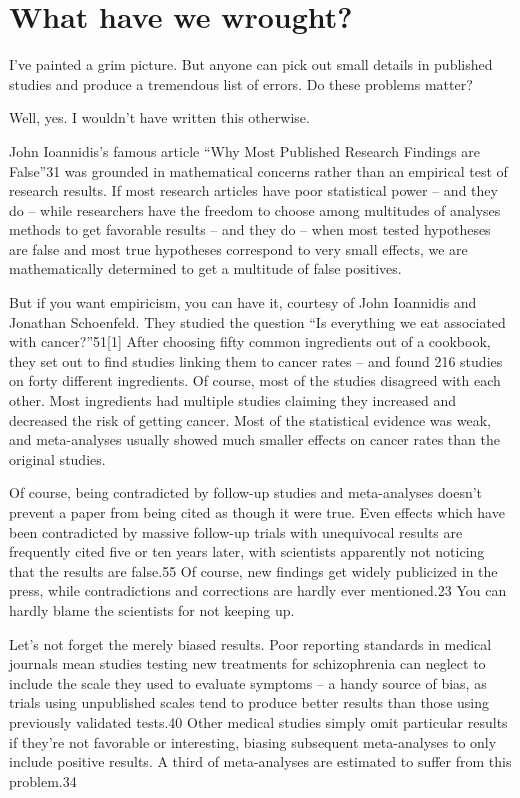 \chapter{What have we wrought?}
\label{chp11}


I’ve painted a grim picture. But anyone can pick out small details in published studies and produce a tremendous list of errors. Do these problems matter?

Well, yes. I wouldn’t have written this otherwise.

John Ioannidis’s famous article “Why Most Published Research Findings are False”31 was grounded in mathematical concerns rather than an empirical test of research results. If most research articles have poor statistical power – and they do – while researchers have the freedom to choose among multitudes of analyses methods to get favorable results – and they do – when most tested hypotheses are false and most true hypotheses correspond to very small effects, we are mathematically determined to get a multitude of false positives.

But if you want empiricism, you can have it, courtesy of John Ioannidis and Jonathan Schoenfeld. They studied the question “Is everything we eat associated with cancer?”51[1] After choosing fifty common ingredients out of a cookbook, they set out to find studies linking them to cancer rates – and found 216 studies on forty different ingredients. Of course, most of the studies disagreed with each other. Most ingredients had multiple studies claiming they increased and decreased the risk of getting cancer. Most of the statistical evidence was weak, and meta-analyses usually showed much smaller effects on cancer rates than the original studies.

Of course, being contradicted by follow-up studies and meta-analyses doesn’t prevent a paper from being cited as though it were true. Even effects which have been contradicted by massive follow-up trials with unequivocal results are frequently cited five or ten years later, with scientists apparently not noticing that the results are false.55 Of course, new findings get widely publicized in the press, while contradictions and corrections are hardly ever mentioned.23 You can hardly blame the scientists for not keeping up.

Let’s not forget the merely biased results. Poor reporting standards in medical journals mean studies testing new treatments for schizophrenia can neglect to include the scale they used to evaluate symptoms – a handy source of bias, as trials using unpublished scales tend to produce better results than those using previously validated tests.40 Other medical studies simply omit particular results if they’re not favorable or interesting, biasing subsequent meta-analyses to only include positive results. A third of meta-analyses are estimated to suffer from this problem.34

